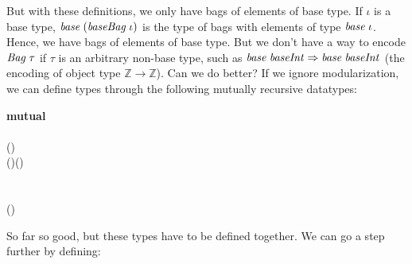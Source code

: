 But with these definitions, we only have bags of elements of base type. If
\ensuremath{\iota} is a base type, \ensuremath{\Varid{base}\;(\Varid{baseBag}\;\iota)} is the type of bags with elements
of type \ensuremath{\Varid{base}\;\iota}. Hence, we have bags of elements of base type. But we don't
have a way to encode \ensuremath{\Conid{Bag}\;\tau} if \ensuremath{\tau} is an arbitrary non-base type, such as
\ensuremath{\Varid{base}\;\Varid{baseInt}\Rightarrow\Varid{base}\;\Varid{baseInt}} (the encoding of object type \ensuremath{\mathbb{Z}\to \mathbb{Z}}).
%
Can we do better? If we ignore modularization, we can define types through the
following mutually recursive datatypes:

\begin{hscode}\SaveRestoreHook
{}%
%
%
%
%
%
%
%
%
%
\>[B]{}\textbf{mutual}{}\<[E]%
\\
\>[B]{}\<[3]%
\>[3]{}\;\typcolon{}\;\<[E]%
\\
\>[3]{}\<[5]%
\>[5]{}\<[11]%
\>[11]{}\typcolon{}\<[11E]%
\>[14]{}\;(\iota\typcolon{}\;){}\<[48]%
\>[48]{}\to {}\<[E]%
\\
\>[3]{}\<[5]%
\>[5]{}\text{\textunderscore}\mathord{\Rightarrow}\text{\textunderscore}{}\<[11]%
\>[11]{}\typcolon{}\<[11E]%
\>[14]{}\;(\sigma\typcolon{}){}\<[32]%
\>[32]{}\to (\tau\typcolon{})\to {}\<[E]%
\\[\blanklineskip]%
\>[B]{}\<[3]%
\>[3]{}\;\typcolon{}\;\<[E]%
\\
\>[3]{}\<[5]%
\>[5]{}\<[14]%
\>[14]{}\typcolon{}\<[17]%
\>[17]{}\;\<[E]%
\\
\>[3]{}\<[5]%
\>[5]{}\<[14]%
\>[14]{}\typcolon{}\<[17]%
\>[17]{}\;(\iota\typcolon{})\to {}\<[E]%
\ColumnHook
\end{hscode}\resethooks

So far so good, but these types have to be defined together. We
can go a step further by defining:

